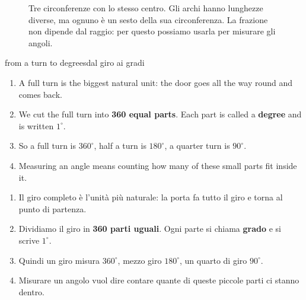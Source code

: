 \begin{figure}[htbp]
\centering
%
      {Tre circonferenze con lo stesso centro. Gli archi hanno lunghezze diverse, ma ognuno è un sesto della sua circonferenza. La frazione non dipende dal raggio: per questo possiamo usarla per misurare gli angoli.}
\label{fig:concentric}
\end{figure}

\begin{rebuild}{from a turn to degrees}{dal giro ai gradi}
\begin{enumerate}[label=\arabic*.]
\item A full turn is the biggest natural unit: the door goes all the way round and comes back.
\item We cut the full turn into \textbf{360 equal parts}. Each part is called a \textbf{degree} and is written $1^\circ$.
\item So a full turn is $360^\circ$, half a turn is $180^\circ$, a quarter turn is $90^\circ$.
\item Measuring an angle means counting how many of these small parts fit inside it.
\end{enumerate}
\tcblower
\begin{enumerate}[label=\arabic*.]
\item Il giro completo è l'unità più naturale: la porta fa tutto il giro e torna al punto di partenza.
\item Dividiamo il giro in \textbf{360 parti uguali}. Ogni parte si chiama \textbf{grado} e si scrive $1^\circ$.
\item Quindi un giro misura $360^\circ$, mezzo giro $180^\circ$, un quarto di giro $90^\circ$.
\item Misurare un angolo vuol dire contare quante di queste piccole parti ci stanno dentro.
\end{enumerate}
\end{rebuild}

